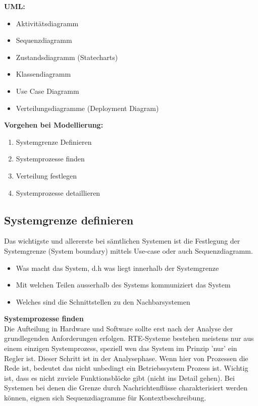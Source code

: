 \begin{multicols}{2}
	\textbf{UML:}
	\begin{itemize}
		\item Aktivitätsdiagramm
		\item Sequenzdiagramm
		\item Zustandsdiagramm (Statecharts)
		\item Klassendiagramm
		\item Use Case Diagramm
		\item Verteilungsdiagramme (Deployment Diagram)
	\end{itemize}
	\columnbreak
	
	\textbf{Vorgehen bei Modellierung:}\\
	\begin{enumerate}
		\item Systemgrenze Definieren
		\item Systemprozesse finden
		\item Verteilung festlegen 
		\item Systemprozesse detaillieren
	\end{enumerate}
\end{multicols}

\subsection{Systemgrenze definieren }
Das wichtigste und allererste bei sämtlichen Systemen ist die Festlegung der Systemgrenze (System boundary)
mittels Use-case oder auch Sequenzdiagramm.
\begin{itemize}
	\item Was macht das System, d.h was liegt innerhalb der Systemgrenze
	\item Mit welchen Teilen ausserhalb des Systems kommuniziert das System
	\item Welches sind die Schnittstellen zu den Nachbarsystemen
\end{itemize}

\textbf{Systemprozesse finden}\\
Die Aufteilung in Hardware und Software sollte erst nach der Analyse der grundlegenden Anforderungen erfolgen.
RTE-Systeme bestehen meistens nur aus einem einzigen Systemprozess, speziell wen das System im Prinzip 'nur' ein
Regler ist. Dieser Schritt ist in der Analysephase. Wenn hier von Prozessen die Rede ist, bedeutet das nicht unbedingt ein
Betriebssystem Prozess ist. Wichtig ist, dass es nicht zuviele Funktionsblöcke gibt (nicht ins Detail gehen). \newline
Bei Systemen bei denen die Grenze durch Nachrichtenflüsse charakterisiert werden können, eignen sich Sequenzdiagramme
für Kontextbeschreibung.

